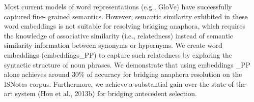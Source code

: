 Most current models of word representations (e.g., GloVe) have successfully captured fine- grained semantics. However, semantic similarity exhibited in these word embeddings is not suitable for resolving bridging anaphora, which requires the knowledge of associative similarity (i.e., relatedness) instead of semantic similarity information between synonyms or hypernyms. We create word embeddings (embeddings\_PP) to capture such relatedness by exploring the syntactic structure of noun phrases. We demonstrate that using embeddings \_PP alone achieves around 30\% of accuracy for bridging anaphora resolution on the ISNotes corpus. Furthermore, we achieve a substantial gain over the state-of-the-art system (Hou et al., 2013b) for bridging antecedent selection.
